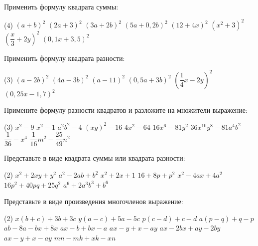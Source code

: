 \begin{class}[number=4]
	\begin{listofex}
		\item Применить формулу квадрата суммы:
		\begin{tasks}(4)
			\task \( (a+b)^2 \)
			\task \( (2a+3)^2 \)
			\task \( (3a+2b)^2 \)
			\task \( (5a+0,2b)^2 \)
			\task \( (12+4x)^2 \)
			\task \( (x^2+3)^2 \)
			\task \( \left( \dfrac{x}{3}+2y \right)^2 \)
			\task \( (0,1x+3,5)^2 \)
		\end{tasks}
		\item Применить формулу квадрата разности:
		\begin{tasks}(3)
			\task \( (a-2b)^2 \)
			\task \( (4a-3b)^2 \)
			\task \( (a-11)^2 \)
			\task \( (0,5a+3b)^2 \)
			\task \( \left( \dfrac{1}{4}x-2y \right)^2 \)
			\task \( (0,25x-1,7)^2 \)
		\end{tasks}
		\item Примените формулу разности квадратов и разложите на множители выражение:
		\begin{tasks}(3)
			\task \( x^2-9 \)
			\task \( x^2-1 \)
			\task \( a^2b^2-4 \)
			\task \( (xy)^2-16 \)
			\task \( 4x^2-64 \)
			\task \( 16x^6-81y^2 \)
			\task \( 36x^{10}y^8-81a^4b^2 \)
			\task \( \dfrac{1}{36}-x^4 \)
			\task \( \dfrac{1}{16}m^2-\dfrac{25}{49}n^2 \)
		\end{tasks}
		\item Представьте в виде квадрата суммы или квадрата разности:
		\begin{tasks}(2)
			\task \( x^2+2xy+y^2 \)
			\task \( a^2-2ab+b^2 \)
			\task \( x^2+2x+1 \)
			\task \( 16+8p+p^2 \)
			\task \( x^2-4ax+4a^2 \)
			\task \( 16p^2+40pq+25q^2 \)
			\task \( a^6+2a^3b^3+b^6 \)
		\end{tasks}
		\item Представьте в виде произведения многочленов выражение:
		\begin{tasks}(2)
			\task \( x(b+c)+3b+3c \)
			\task \( y(a-c)+5a-5c \)
			\task \( p(c-d)+c-d \)
			\task \( a(p-q)+q-p \)
			\task \( ab-8a-bx+8x \)
			\task \( ax-b+bx-a \)
			\task \( ax-y+x-ay \)
			\task \( ax-2bx+ay-2by \)
			\task \( ax-y+x-ay \)
			\task \( mn-mk+xk-xn \)
		\end{tasks}
	\end{listofex}
\end{class}

